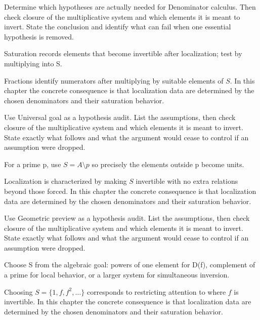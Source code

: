 \begin{exercise}\label{exr:v05-06}
Determine which hypotheses are actually needed for Denominator calculus. Then check closure of the multiplicative system and which elements it is meant to invert. State the conclusion and identify what can fail when one essential hypothesis is removed.
\end{exercise}
\begin{hint}
Saturation records elements that become invertible after localization; test by multiplying into S.
\end{hint}
\begin{solution}
Fractions identify numerators after multiplying by suitable elements of $S$. In this chapter the concrete consequence is that localization data are determined by the chosen denominators and their saturation behavior.
\end{solution}

\begin{exercise}\label{exr:v05-07}
Use Universal goal as a hypothesis audit. List the assumptions, then check closure of the multiplicative system and which elements it is meant to invert. State exactly what follows and what the argument would cease to control if an assumption were dropped.
\end{exercise}
\begin{hint}
For a prime p, use \(S=A\setminus p\) so precisely the elements outside p become units.
\end{hint}
\begin{solution}
Localization is characterized by making $S$ invertible with no extra relations beyond those forced. In this chapter the concrete consequence is that localization data are determined by the chosen denominators and their saturation behavior.
\end{solution}

\begin{exercise}\label{exr:v05-08}
Use Geometric preview as a hypothesis audit. List the assumptions, then check closure of the multiplicative system and which elements it is meant to invert. State exactly what follows and what the argument would cease to control if an assumption were dropped.
\end{exercise}
\begin{hint}
Choose S from the algebraic goal: powers of one element for D(f), complement of a prime for local behavior, or a larger system for simultaneous inversion.
\end{hint}
\begin{solution}
Choosing $S=\{1,f,f^2,\dots\}$ corresponds to restricting attention to where $f$ is invertible. In this chapter the concrete consequence is that localization data are determined by the chosen denominators and their saturation behavior.
\end{solution}

